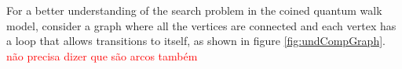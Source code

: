 \documentclass[../../dissertation.tex]{subfiles}
\begin{document}
For a better understanding of the search problem in the coined quantum walk model, consider a graph where all the vertices are connected and each vertex has a loop that allows transitions to itself, as shown in figure \ref{fig:undCompGraph}. \textcolor{red}{não precisa dizer que são arcos também}
%
%                    
\end{document}
